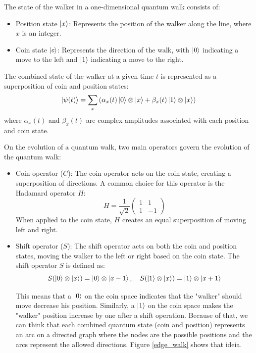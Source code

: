 \documentclass{article}
\begin{document}
		The state of the walker in a one-dimensional quantum walk consists of:
		\begin{itemize}
			\item Position state \( \ket{x} \): Represents the position of the walker along the line, where \( x \) is an integer.
			\item Coin state \( \ket{c} \): Represents the direction of the walk, with \( \ket{0} \) indicating a move to the left and \( \ket{1} \) indicating a move to the right.
		\end{itemize}
		
		The combined state of the walker at a given time \( t \) is represented as a superposition of coin and position states:
		\[
		\ket{\psi(t)} = \sum_{x} \left( \alpha_x(t) \ket{0} \otimes \ket{x} + \beta_x(t) \ket{1} \otimes \ket{x} \right)
		\]
		where \( \alpha_x(t) \) and \( \beta_x(t) \) are complex amplitudes associated with each position and coin state.
		
		On the evolution of a quantum walk, two main operators govern the evolution of the quantum walk:
		\begin{itemize}
			\item Coin operator ($C$): The coin operator acts on the coin state, creating a superposition of directions. A common choice for this operator is the Hadamard operator \( H \):
			\[
			H = \frac{1}{\sqrt{2}} \begin{pmatrix} 1 & 1 \\ 1 & -1 \end{pmatrix}
			\]
			When applied to the coin state, \( H \) creates an equal superposition of moving left and right.
			\item Shift operator ($S$): The shift operator acts on both the coin and position states, moving the walker to the left or right based on the coin state. The shift operator \( S \) is defined as:
			\[
			S(\ket{0} \otimes \ket{x}) = \ket{0} \otimes \ket{x-1}, \quad S(\ket{1} \otimes \ket{x}) = \ket{1} \otimes \ket{x+1}
			\]

			This means that a $\ket{0}$ on the coin space indicates that the "walker" should move decrease his position. Similarly, a $\ket{1}$ on the coin space makes the "walker" position increase by one after a shift operation. Because of that, we can think that each combined quantum state (coin and position) represents an arc on a directed graph where the nodes are the possible positions and the arcs represent the allowed directions. Figure \ref{edge_walk} shows that ideia.
		\end{itemize}
\end{document}
